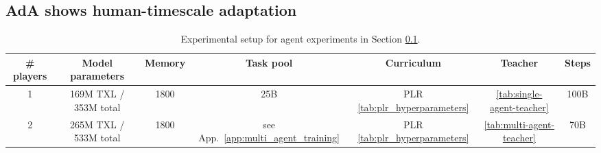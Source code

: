 \documentclass[11pt, a4paper, logo, copyright]{deepmind}
\begin{document}
\subsection{AdA shows human-timescale adaptation} \label{sec:results_human_scale_adaptation}
\begin{table}[h!]
  \begin{center}
    \caption{Experimental setup for agent experiments in Section \ref{sec:results_human_scale_adaptation}.}
    \begin{tabular}{c|c|c|c|c|c|c}
    \label{tab:human-timescale-settings}
      \# players & Model parameters & Memory & Task pool & Curriculum & Teacher & Steps\\
      \hline
      1 & 169M TXL / 353M total & 1800 & 25B & PLR \ref{tab:plr_hyperparameters} & \ref{tab:single-agent-teacher} & 100B \\
      2 & 265M TXL / 533M total & 1800 & see App.~\ref{app:multi_agent_training} & PLR \ref{tab:plr_hyperparameters} & \ref{tab:multi-agent-teacher} & 70B \\
    \end{tabular}
  \end{center}
\end{table}
\end{document}
